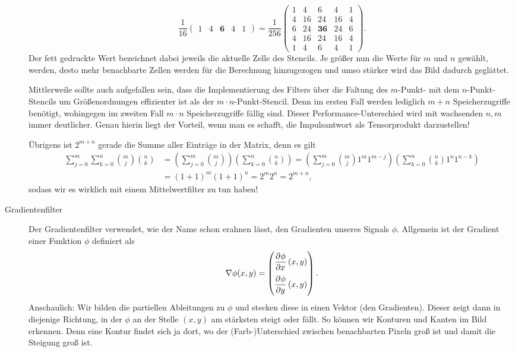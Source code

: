 \begin{example}
\begin{description}
\[        \frac{1}{16} \begin{pmatrix} 1 & 4 & \mathbf{6} & 4 & 1 \end{pmatrix}
    = \frac{1}{256} \begin{pmatrix}
        1 &  4 & 6  & 4  & 1 \\
        4 & 16 & 24 & 16 & 4 \\
        6 & 24 & \mathbf{36} & 24 & 6 \\
        4 & 16 & 24 & 16 & 4 \\
        1 &  4 &  6 &  4 & 1
      \end{pmatrix}.
  \]
  Der fett gedruckte Wert bezeichnet dabei jeweils die aktuelle Zelle des Stencils. Je größer nun 
  die Werte für $ m $ und $ n $ gewählt, werden, desto mehr benachbarte Zellen werden für die
  Berechnung hinzugezogen und umso stärker wird das Bild dadurch geglättet.
  
  Mittlerweile sollte auch aufgefallen sein, dass die Implementierung des Filters über die Faltung
  des $ m $-Punkt- mit dem $ n $-Punkt-Stencils um Größenordnungen effizienter ist als der
  $ m \cdot n $-Punkt-Stencil. Denn im ersten Fall werden lediglich $ m + n $ Speicherzugriffe
  benötigt, wohingegen im zweiten Fall $ m \cdot n $ Speicherzugriffe fällig sind. Dieser
  Performance-Unterschied wird mit wachsenden $ n, m $ immer deutlicher. Genau hierin liegt der
  Vorteil, wenn man es schafft, die Impulsantwort als Tensorprodukt darzustellen!
  
  Übrigens ist $ 2^{m + n} $ gerade die Summe aller Einträge in der Matrix, denn es gilt
  \begin{align*}
      \sum_{j = 0}^{m} \sum_{k = 0}^{n} \binom{m}{j} \binom{n}{k}
   &= \left( \sum_{j = 0}^{m} \binom{m}{j} \right) \left( \sum_{k = 0}^{n} \binom{n}{k} \right)
    = \left( \sum_{j = 0}^{m} \binom{m}{j} 1^{m} 1^{m - j} \right) 
        \left( \sum_{k = 0}^{n} \binom{n}{k} 1^{n} 1^{n - k} \right) \\
   &= (1 + 1)^{m} (1 + 1)^{n}
    = 2^{m} 2^{n}
    = 2^{m + n},
  \end{align*}
  sodass wir es wirklich mit einem Mittelwertfilter zu tun haben!
\item [Gradientenfilter]
  Der Gradientenfilter verwendet, wie der Name schon erahnen lässt, den Gradienten unseres
  Signals $ \phi $. Allgemein ist der Gradient einer Funktion $ \phi $ definiert als
  \[
    \nabla \phi(x,y) = \begin{pmatrix}
    \dpd{\phi}{x}(x,y) \\[1em]
    \dpd{\phi}{y}(x,y)
    \end{pmatrix}.
  \]
  Anschaulich: Wir bilden die partiellen Ableitungen zu $ \phi $ und stecken diese in einen Vektor 
  (den Gradienten). Dieser zeigt dann in diejenige Richtung, in der $ \phi $ an der Stelle $ (x,y) $
  am stärksten steigt oder fällt. So können wir Konturen und Kanten im Bild erkennen. Denn eine 
  Kontur findet sich ja dort, wo der (Farb-)Unterschied zwischen benachbarten Pixeln groß ist und
  damit die Steigung groß ist.
  

\end{description}
\end{example}

